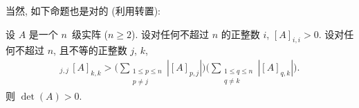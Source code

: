 \documentclass[../libro.tex]{subfiles}
\begin{document}



当然, 如下命题也是对的 (利用转置):

\begin{theorem}
    设 \(A\) 是一个 \(n\)~级实阵 (\(n \geq 2\)).
    设对任何不超过 \(n\) 的正整数 \(i\),
    \([A]_{i,i} > 0\).
    设对任何不超过 \(n\), 且不等的正整数 \(j\), \(k\),
    \begin{align*}
        [A]_{j,j}\,[A]_{k,k} >
        \Bigg(
            \sum_{\substack{1 \leq p \leq n \\
            p \neq j}} {|[A]_{p,j}|}
        \Bigg)
        \Bigg(
            \sum_{\substack{1 \leq q \leq n \\
            q \neq k}} {|[A]_{q,k}|}
        \Bigg).
    \end{align*}
    则 \(\det {(A)} > 0\).
\end{theorem}
\end{document}
